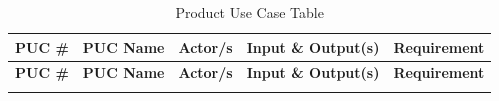 \documentclass[12pt]{article}
\begin{document}
\setlength\extrarowheight{2mm}
\renewcommand{\arraystretch}{0.85}
\begin{longtable}{|c|
    >{\raggedright\arraybackslash}p{1.5in}|  %
    >{\raggedright\arraybackslash}p{1in}|
    >{\raggedright\arraybackslash}p{1.8in}|
  >{\raggedright\arraybackslash}p{1.1in}|}  %
  \caption{Product Use Case Table}
  \label{tab:puc} \\
  \hline
  \textbf{PUC \#} & \textbf{PUC Name} & \textbf{Actor/s} &
  \textbf{Input \& Output(s)} & \textbf{Requirement} \\
  \hline
  \endfirsthead

  \hline
  \textbf{PUC \#} & \textbf{PUC Name} & \textbf{Actor/s} &
  \textbf{Input \& Output(s)} & \textbf{Requirement} \\
  \hline
  \endhead

  \hline
  \endfoot

  \hline
  \endlastfoot


\end{longtable}
\end{document}
